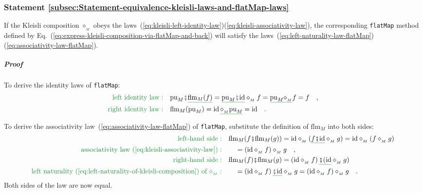 \subsubsection{Statement \label{subsec:Statement-equivalence-kleisli-laws-and-flatMap-laws}\ref{subsec:Statement-equivalence-kleisli-laws-and-flatMap-laws}}

If the Kleisli composition $\diamond_{_{M}}$ obeys the laws~(\ref{eq:kleisli-left-identity-law})\textendash (\ref{eq:kleisli-associativity-law}),
the corresponding \lstinline!flatMap! method defined by Eq.~(\ref{eq:express-kleisli-composition-via-flatMap-and-back})
will satisfy the laws~(\ref{eq:left-naturality-law-flatMap})\textendash (\ref{eq:associativity-law-flatMap}).

\subparagraph{Proof}

To derive the identity laws of \lstinline!flatMap!:
\begin{align*}
{\color{greenunder}\text{left identity law}:}\quad & \text{pu}_{M}\bef\gunderline{\text{flm}_{M}(f)}=\gunderline{\text{pu}_{M}\bef\text{id}}\diamond_{_{M}}f=\gunderline{\text{pu}_{M}\diamond_{_{M}}}f=f\quad,\\
{\color{greenunder}\text{right identity law}:}\quad & \text{flm}_{M}(\text{pu}_{M})=\text{id}\,\gunderline{\diamond_{_{M}}\text{pu}_{M}}=\text{id}\quad.
\end{align*}

To derive the associativity law~(\ref{eq:associativity-law-flatMap})
of \lstinline!flatMap!, substitute the definition of $\text{flm}_{M}$
into both sides:
\begin{align*}
{\color{greenunder}\text{left-hand side}:}\quad & \text{flm}_{M}(f\bef\text{flm}_{M}(g))=\text{id}\diamond_{_{M}}(\gunderline{f\bef\text{id}}\diamond_{_{M}}g)=\text{id}\diamond_{_{M}}(f\diamond_{_{M}}g)\\
{\color{greenunder}\text{associativity law~(\ref{eq:kleisli-associativity-law})}:}\quad & \quad=(\text{id}\diamond_{_{M}}f)\diamond_{_{M}}g\quad,\\
{\color{greenunder}\text{right-hand side}:}\quad & \text{flm}_{M}(f)\bef\text{flm}_{M}(g)=(\text{id}\diamond_{_{M}}f)\,\gunderline{\bef(\text{id}}\diamond_{_{M}}g)\\
{\color{greenunder}\text{left naturality~(\ref{eq:left-naturality-of-kleisli-composition}) of }\diamond_{_{M}}:}\quad & \quad=(\text{id}\diamond_{_{M}}f)\,\gunderline{\bef\text{id}}\diamond_{_{M}}g=(\text{id}\diamond_{_{M}}f)\diamond_{_{M}}g\quad.
\end{align*}
Both sides of the law are now equal.

